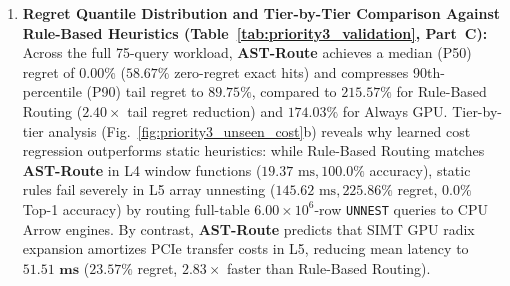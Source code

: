 \documentclass[10pt,a4paper]{article}
\begin{document}
\begin{enumerate}[leftmargin=1.5em,itemsep=0.8pt]
than universal optimality across arbitrary production workloads.
    \item \textbf{Regret Quantile Distribution and Tier-by-Tier Comparison Against Rule-Based Heuristics (Table~\ref{tab:priority3_validation}, Part~C):} Across the full 75-query workload, \textbf{AST-Route} achieves a median (P50) regret of $\mathbf{0.00\%}$ ($58.67\%$ zero-regret exact hits) and compresses 90th-percentile (P90) tail regret to $\mathbf{89.75\%}$, compared to $215.57\%$ for Rule-Based Routing ($2.40\times$ tail regret reduction) and $174.03\%$ for Always GPU. Tier-by-tier analysis (Fig.~\ref{fig:priority3_unseen_cost}b) reveals why learned cost regression outperforms static heuristics: while Rule-Based Routing matches \textbf{AST-Route} in L4 window functions ($19.37\text{ ms}, 100.0\%$ accuracy), static rules fail severely in L5 array unnesting ($145.62\text{ ms}, 225.86\%$ regret, $0.0\%$ Top-1 accuracy) by routing full-table $6.00\times 10^6$-row \texttt{UNNEST} queries to CPU Arrow engines. By contrast, \textbf{AST-Route} predicts that SIMT GPU radix expansion amortizes PCIe transfer costs in L5, reducing mean latency to $\mathbf{51.51\text{ ms}}$ ($23.57\%$ regret, $\mathbf{2.83\times}$ faster than Rule-Based Routing).
\end{enumerate}
\end{document}
